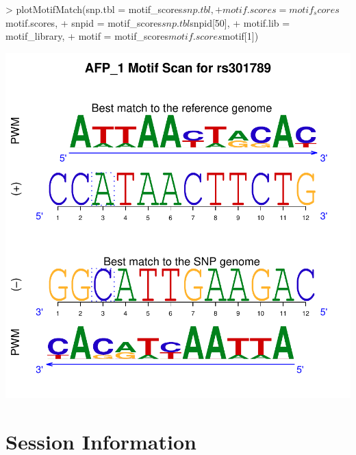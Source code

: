 \documentclass[a4paper,10pt]{article}
\begin{document}
\begin{Schunk}
\begin{Sinput}
> plotMotifMatch(snp.tbl = motif_scores$snp.tbl,
+                motif.scores = motif_scores$motif.scores,
+                snpid = motif_scores$snp.tbl$snpid[50],
+                motif.lib = motif_library,
+                motif = motif_scores$motif.scores$motif[1])
\end{Sinput}
\end{Schunk}
\includegraphics{atsnp-010}

\section{Session Information}
\end{document}
